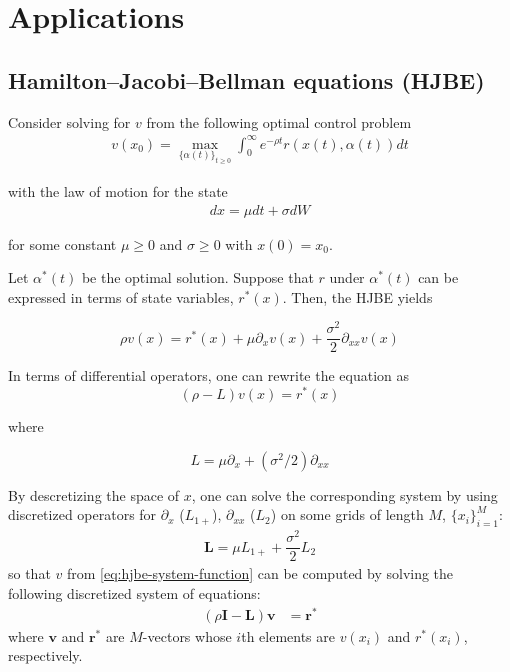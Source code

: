 \documentclass[11pt]{article}
\begin{document}
\section{Applications}

\subsection{Hamilton–Jacobi–Bellman equations (HJBE)}
Consider solving for $v$ from the following optimal control problem
\begin{align}
v(x_0) = \max_{ {\{\alpha(t) \} }_{t \geq 0} } \int_{0}^\infty e^{-\rho t} r( x(t), \alpha(t )) dt
\end{align}

with the law of motion for the state 
\begin{align}
dx = \mu dt + \sigma dW 
\end{align}


for some constant $\mu \geq 0$ and $\sigma \geq 0$ with $x(0) = x_0$.

Let $\alpha^*(t)$ be the optimal solution. Suppose that $r$ under $\alpha^*(t)$ can be expressed in terms of state variables, $r^* (x)$. Then, the HJBE yields

\begin{equation}\label{eq:hamilton-jacobi-bellman}
\rho v(x) = r^*(x) +  \mu  \partial_{x} v(x) + \dfrac{\sigma^2}{2} \partial_{xx} v(x)
\end{equation}

In terms of differential operators, one can rewrite the equation as
\begin{equation}\label{eq:hjbe-system-function}
(\rho - L) v(x) = r^*(x)
\end{equation}

where 

\begin{equation}\label{eq:L-defn}
L = \mu \partial_{x} + (\sigma^2/2) \partial_{xx}
\end{equation}


By descretizing the space of $x$, one can solve the corresponding system by using discretized operators for $\partial_{x}$ ($L_{1+}$), $\partial_{xx}$ ($L_2$) on some grids of length $M$, $\{x_i\}_{i=1}^M$:
\begin{align}\label{eq:L-descritized-defn}
\mathbf{L} = \mu L_{1+} + \dfrac{\sigma^2}{2} L_{2}
\end{align}
so that $v$ from \eqref{eq:hjbe-system-function} can be computed by solving the following discretized system of equations:
\begin{align}
(\rho \mathbf{I} - \mathbf{L}) \mathbf{v} &= \mathbf{r^*} 
\end{align}
where $\mathbf{v}$ and $\mathbf{r^*}$ are $M$-vectors whose $i$th elements are $v(x_i)$ and $r^*(x_i)$, respectively.
\end{document}
